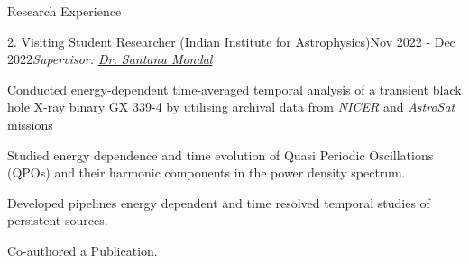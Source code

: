 \begin{rSection}{Research Experience}
\hspace{-1.2em}\begin{rSubsection}{2. Visiting Student Researcher (Indian Institute for Astrophysics)}{Nov 2022 - Dec 2022}{\emph{Supervisor: \href{https://www.iiap.res.in/people/profile/academic/santanu-mondal/}{Dr. Santanu Mondal}}}{}
\item Conducted energy-dependent time-averaged temporal analysis of a transient black hole X-ray binary GX 339-4 by utilising archival data from \textit{NICER} and \textit{AstroSat} missions 
\item Studied energy dependence and time evolution of Quasi Periodic Oscillations (QPOs) and their harmonic
components in the power density spectrum.
\item Developed pipelines energy dependent and time resolved temporal studies of persistent sources. 
\item Co-authored a Publication.
\end{rSubsection}
\end{rSection}
